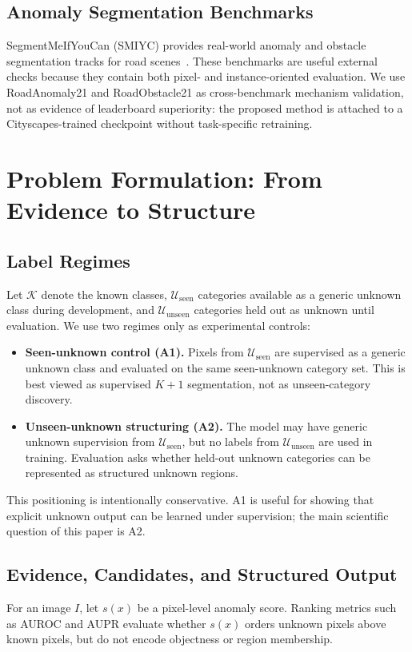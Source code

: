 \documentclass[journal]{IEEEtai}
\newcommand{\cK}{\mathcal{K}}
\newcommand{\cUs}{\mathcal{U}_{\mathrm{seen}}}
\newcommand{\cUu}{\mathcal{U}_{\mathrm{unseen}}}
\begin{document}
\subsection{Anomaly Segmentation Benchmarks}
SegmentMeIfYouCan (SMIYC) provides real-world anomaly and obstacle segmentation tracks for road scenes~\cite{chan2021smiyc}. These benchmarks are useful external checks because they contain both pixel- and instance-oriented evaluation. We use RoadAnomaly21 and RoadObstacle21 as cross-benchmark mechanism validation, not as evidence of leaderboard superiority: the proposed method is attached to a Cityscapes-trained checkpoint without task-specific retraining.

\section{Problem Formulation: From Evidence to Structure}
\label{sec:problem}

\subsection{Label Regimes}
Let $\cK$ denote the known classes, $\cUs$ categories available as a generic unknown class during development, and $\cUu$ categories held out as unknown until evaluation. We use two regimes only as experimental controls:
\begin{itemize}[leftmargin=*]
    \item \textbf{Seen-unknown control (A1).} Pixels from $\cUs$ are supervised as a generic unknown class and evaluated on the same seen-unknown category set. This is best viewed as supervised $K{+}1$ segmentation, not as unseen-category discovery.
    \item \textbf{Unseen-unknown structuring (A2).} The model may have generic unknown supervision from $\cUs$, but no labels from $\cUu$ are used in training. Evaluation asks whether held-out unknown categories can be represented as structured unknown regions.
\end{itemize}
This positioning is intentionally conservative. A1 is useful for showing that explicit unknown output can be learned under supervision; the main scientific question of this paper is A2.

\subsection{Evidence, Candidates, and Structured Output}
For an image $I$, let $s(x)$ be a pixel-level anomaly score. Ranking metrics such as AUROC and AUPR evaluate whether $s(x)$ orders unknown pixels above known pixels, but do not encode objectness or region membership.
\end{document}
